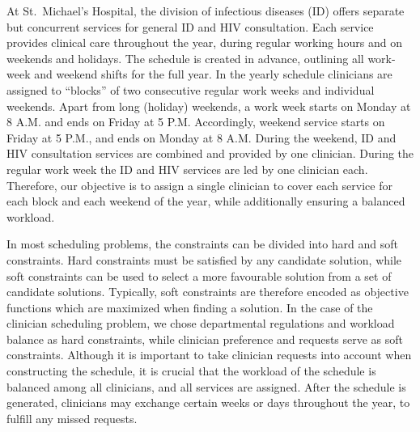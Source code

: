 At St.\ Michael's Hospital, the division of infectious diseases (ID) offers
separate but concurrent services for general ID and HIV consultation. Each
service provides clinical care throughout the year, during regular working hours
and on weekends and holidays. The schedule is created in advance,
outlining all work-week and weekend shifts for the full year.
In the yearly schedule clinicians are assigned to ``blocks'' of
two consecutive regular work weeks and individual weekends. Apart
from long (holiday) weekends, a work week starts on Monday at 8 A.M. and ends on
Friday at 5 P.M. Accordingly, weekend service starts on Friday at 5 P.M., and
ends on Monday at 8 A.M. During the weekend, ID and HIV consultation services
are combined and provided by one clinician. During the regular work week the ID
and HIV services are led by one clinician each.
Therefore, our objective is to assign a single clinician to cover
each service for each block and each weekend of the year, while 
additionally ensuring a balanced workload.

In most scheduling problems, the constraints can be divided into hard and soft
constraints. Hard constraints must be satisfied by any candidate solution, while
soft constraints can be used to select a more favourable solution from a set of
candidate solutions. Typically, soft constraints are therefore encoded as objective
functions which are
maximized when finding a solution. In the case of the clinician
scheduling problem, we chose departmental regulations and workload balance as hard constraints,
while clinician preference and requests serve as soft constraints.
Although it is important to take clinician requests into account when constructing
the schedule, it is crucial that the workload of the schedule is balanced among
all clinicians, and all services are assigned.
After the schedule is generated, clinicians may
exchange certain weeks or days throughout the year, to fulfill any missed requests.

